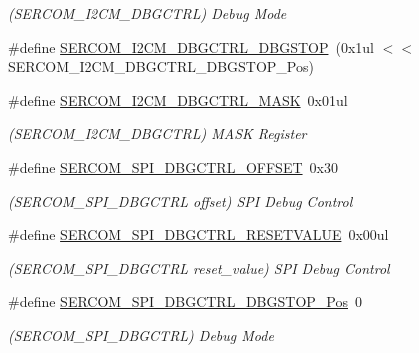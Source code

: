 \begin{DoxyCompactItemize}
\begin{DoxyCompactList}\small\item\em (S\+E\+R\+C\+O\+M\+\_\+\+I2\+C\+M\+\_\+\+D\+B\+G\+C\+T\+RL) Debug Mode \end{DoxyCompactList}\item 
\#define \mbox{\hyperlink{group___s_a_m_d21___s_e_r_c_o_m_ga327fdede48060721b95711635a6cb4c5}{S\+E\+R\+C\+O\+M\+\_\+\+I2\+C\+M\+\_\+\+D\+B\+G\+C\+T\+R\+L\+\_\+\+D\+B\+G\+S\+T\+OP}}~(0x1ul $<$$<$ S\+E\+R\+C\+O\+M\+\_\+\+I2\+C\+M\+\_\+\+D\+B\+G\+C\+T\+R\+L\+\_\+\+D\+B\+G\+S\+T\+O\+P\+\_\+\+Pos)
\item 
\#define \mbox{\hyperlink{group___s_a_m_d21___s_e_r_c_o_m_ga81ace5c1c4c23377532cac6c5e94b833}{S\+E\+R\+C\+O\+M\+\_\+\+I2\+C\+M\+\_\+\+D\+B\+G\+C\+T\+R\+L\+\_\+\+M\+A\+SK}}~0x01ul
\begin{DoxyCompactList}\small\item\em (S\+E\+R\+C\+O\+M\+\_\+\+I2\+C\+M\+\_\+\+D\+B\+G\+C\+T\+RL) M\+A\+SK Register \end{DoxyCompactList}\item 
\#define \mbox{\hyperlink{group___s_a_m_d21___s_e_r_c_o_m_ga774d1d0335e260011568c4dfad9ca8fb}{S\+E\+R\+C\+O\+M\+\_\+\+S\+P\+I\+\_\+\+D\+B\+G\+C\+T\+R\+L\+\_\+\+O\+F\+F\+S\+ET}}~0x30
\begin{DoxyCompactList}\small\item\em (S\+E\+R\+C\+O\+M\+\_\+\+S\+P\+I\+\_\+\+D\+B\+G\+C\+T\+RL offset) S\+PI Debug Control \end{DoxyCompactList}\item 
\#define \mbox{\hyperlink{group___s_a_m_d21___s_e_r_c_o_m_ga8828fb3bbae793780cde1a051e394d32}{S\+E\+R\+C\+O\+M\+\_\+\+S\+P\+I\+\_\+\+D\+B\+G\+C\+T\+R\+L\+\_\+\+R\+E\+S\+E\+T\+V\+A\+L\+UE}}~0x00ul
\begin{DoxyCompactList}\small\item\em (S\+E\+R\+C\+O\+M\+\_\+\+S\+P\+I\+\_\+\+D\+B\+G\+C\+T\+RL reset\+\_\+value) S\+PI Debug Control \end{DoxyCompactList}\item 
\#define \mbox{\hyperlink{group___s_a_m_d21___s_e_r_c_o_m_ga39365bc8f796fccdba95cf8a2b06b63e}{S\+E\+R\+C\+O\+M\+\_\+\+S\+P\+I\+\_\+\+D\+B\+G\+C\+T\+R\+L\+\_\+\+D\+B\+G\+S\+T\+O\+P\+\_\+\+Pos}}~0
\begin{DoxyCompactList}\small\item\em (S\+E\+R\+C\+O\+M\+\_\+\+S\+P\+I\+\_\+\+D\+B\+G\+C\+T\+RL) Debug Mode \end{DoxyCompactList}\item 
$$
\end{DoxyCompactItemize}
